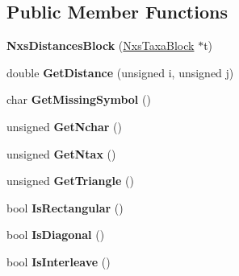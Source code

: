 \subsection*{Public Member Functions}
\begin{DoxyCompactItemize}
\item 
\hypertarget{classNxsDistancesBlock_a0afb8eecb772d5def91a8ab45ef20564}{
{\bfseries NxsDistancesBlock} (\hyperlink{classNxsTaxaBlock}{NxsTaxaBlock} $\ast$t)}
\label{classNxsDistancesBlock_a0afb8eecb772d5def91a8ab45ef20564}

\item 
\hypertarget{classNxsDistancesBlock_ab98d07a76ea319334f4fa9154abe5f61}{
double {\bfseries GetDistance} (unsigned i, unsigned j)}
\label{classNxsDistancesBlock_ab98d07a76ea319334f4fa9154abe5f61}

\item 
\hypertarget{classNxsDistancesBlock_afe9b1dfa12825f9919b00cdaa41e156b}{
char {\bfseries GetMissingSymbol} ()}
\label{classNxsDistancesBlock_afe9b1dfa12825f9919b00cdaa41e156b}

\item 
\hypertarget{classNxsDistancesBlock_a8306a3d48d35bf3e1e1e8c23ffa096c2}{
unsigned {\bfseries GetNchar} ()}
\label{classNxsDistancesBlock_a8306a3d48d35bf3e1e1e8c23ffa096c2}

\item 
\hypertarget{classNxsDistancesBlock_a540edf63d4b225a488f36339411819f6}{
unsigned {\bfseries GetNtax} ()}
\label{classNxsDistancesBlock_a540edf63d4b225a488f36339411819f6}

\item 
\hypertarget{classNxsDistancesBlock_a40cc90a67e533b680fe9169ff25c70eb}{
unsigned {\bfseries GetTriangle} ()}
\label{classNxsDistancesBlock_a40cc90a67e533b680fe9169ff25c70eb}

\item 
\hypertarget{classNxsDistancesBlock_ab0284b8ebcd606ab989d11cc2351aa5d}{
bool {\bfseries IsRectangular} ()}
\label{classNxsDistancesBlock_ab0284b8ebcd606ab989d11cc2351aa5d}

\item 
\hypertarget{classNxsDistancesBlock_a2ff6b037d7deb7f088962df4f1df41f4}{
bool {\bfseries IsDiagonal} ()}
\label{classNxsDistancesBlock_a2ff6b037d7deb7f088962df4f1df41f4}

\item 
\hypertarget{classNxsDistancesBlock_a0c9bcad2e71262f51d2bc494d7981f9f}{
bool {\bfseries IsInterleave} ()}
\label{classNxsDistancesBlock_a0c9bcad2e71262f51d2bc494d7981f9f}


\end{DoxyCompactItemize}
